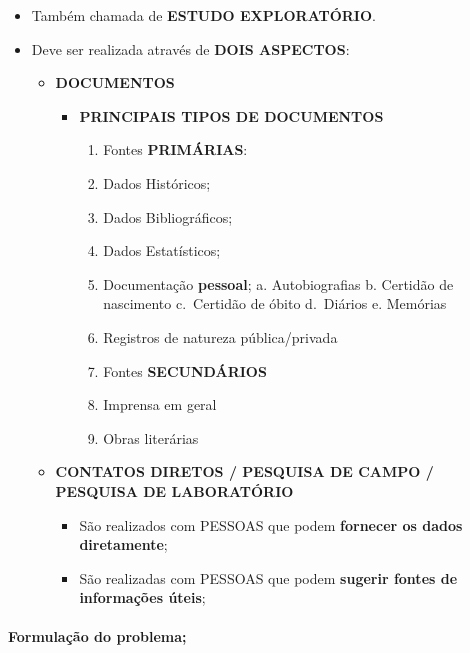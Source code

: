 \documentclass[
]{book}
\providecommand{\tightlist}{%
  \setlength{\itemsep}{0pt}\setlength{\parskip}{0pt}}
\begin{document}
\begin{itemize}
\tightlist
\item
  Também chamada de \textbf{ESTUDO EXPLORATÓRIO}.
\item
  Deve ser realizada através de \textbf{DOIS ASPECTOS}:

  \begin{itemize}
  \tightlist
  \item
    \textbf{DOCUMENTOS}

    \begin{itemize}
    \tightlist
    \item
      \textbf{PRINCIPAIS TIPOS DE DOCUMENTOS}

      \begin{enumerate}
      \def\labelenumi{\alph{enumi}.}
      \tightlist
      \item
        Fontes \textbf{PRIMÁRIAS}:
      \item
        Dados Históricos;
      \item
        Dados Bibliográficos;
      \item
        Dados Estatísticos;
      \item
        Documentação \textbf{pessoal}; a. Autobiografias b. Certidão de
        nascimento c.~Certidão de óbito d.~Diários e. Memórias
      \item
        Registros de natureza pública/privada
      \item
        Fontes \textbf{SECUNDÁRIOS}
      \item
        Imprensa em geral
      \item
        Obras literárias
      \end{enumerate}
    \end{itemize}
  \item
    \textbf{CONTATOS DIRETOS / PESQUISA DE CAMPO / PESQUISA DE
    LABORATÓRIO}

    \begin{itemize}
    \tightlist
    \item
      São realizados com PESSOAS que podem \textbf{fornecer os dados
      diretamente};
    \item
      São realizadas com PESSOAS que podem \textbf{sugerir fontes de
      informações úteis};
    \end{itemize}
  \end{itemize}
\end{itemize}

\hypertarget{formulauxe7uxe3o-do-problema}{%
\paragraph{Formulação do problema;}\label{formulauxe7uxe3o-do-problema}}
\end{document}
